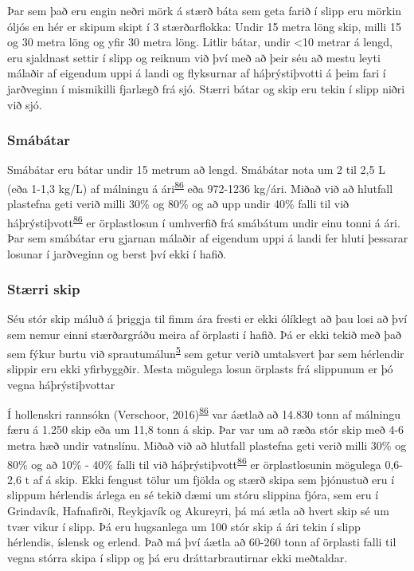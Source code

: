 \documentclass[icelandic,]{book}
\begin{document}
Þar sem það eru engin neðri mörk á stærð báta sem geta farið í slipp eru mörkin óljós en hér er skipum skipt í 3 stærðarflokka: Undir 15 metra löng skip, milli 15 og 30 metra löng og yfir 30 metra löng. Litlir bátar, undir \textless{}10 metrar á lengd, eru sjaldnast settir í slipp og reiknum við því með að þeir séu að mestu leyti málaðir af eigendum uppi á landi og flyksurnar af háþrýstiþvotti á þeim fari í jarðveginn í mismikilli fjarlægð frá sjó. Stærri bátar og skip eru tekin í slipp niðri við sjó.

\hypertarget{smabatar}{%
\subsubsection*{Smábátar}\label{smabatar}}

Smábátar eru bátar undir 15 metrum að lengd. Smábátar nota um 2 til 2,5 L (eða 1-1,3 kg/L) af málningu á ári\textsuperscript{\protect\hyperlink{ref-Verschoor2016}{86}} eða 972-1236 kg/ári. Miðað við að hlutfall plastefna geti verið milli 30\% og 80\% og að upp undir 40\% falli til við háþrýstiþvott\textsuperscript{\protect\hyperlink{ref-Verschoor2016}{86}} er örplastlosun í umhverfið frá smábátum undir einu tonni á ári. Þar sem smábátar eru gjarnan málaðir af eigendum uppi á landi fer hluti þessarar losunar í jarðveginn og berst því ekki í hafið.

\hypertarget{strri-skip}{%
\subsubsection*{Stærri skip}\label{strri-skip}}

Séu stór skip máluð á þriggja til fimm ára fresti er ekki ólíklegt að þau losi að því sem nemur einni stærðargráðu meira af örplasti í hafið. Þá er ekki tekið með það sem fýkur burtu við sprautumálun\textsuperscript{\protect\hyperlink{ref-OECD2009}{5}} sem getur verið umtalsvert þar sem hérlendir slippir eru ekki yfirbyggðir. Mesta mögulega losun örplasts frá slippunum er þó vegna háþrýstiþvottar

Í hollenskri rannsókn (Verschoor, 2016)\textsuperscript{\protect\hyperlink{ref-Verschoor2016}{86}} var áætlað að 14.830 tonn af málningu færu á 1.250 skip eða um 11,8 tonn á skip. Þar var um að ræða stór skip með 4-6 metra hæð undir vatnslínu. Miðað við að hlutfall plastefna geti verið milli 30\% og 80\% og að 10\% - 40\% falli til við háþrýstiþvott\textsuperscript{\protect\hyperlink{ref-Verschoor2016}{86}} er örplastlosunin mögulega 0,6-2,6 t af á skip. Ekki fengust tölur um fjölda og stærð skipa sem þjónustuð eru í slippum hérlendis árlega en sé tekið dæmi um stóru slippina fjóra, sem eru í Grindavík, Hafnafirði, Reykjavík og Akureyri, þá má ætla að hvert skip sé um tvær vikur í slipp. Þá eru hugsanlega um 100 stór skip á ári tekin í slipp hérlendis, íslensk og erlend. Það má því áætla að 60-260 tonn af örplasti falli til vegna stórra skipa í slipp og þá eru dráttarbrautirnar ekki meðtaldar.
\end{document}
